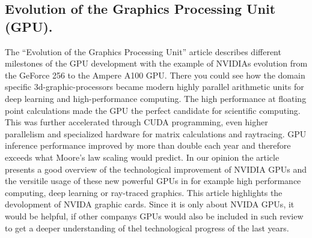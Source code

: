 \subsection{Evolution of the Graphics Processing Unit (GPU).}
The ``Evolution of the Graphics Processing Unit'' article describes different milestones of the GPU development with the example of NVIDIAs evolution from the GeForce 256 to the Ampere A100 GPU. There you could see how the domain specific 3d-graphic-processors became modern highly parallel arithmetic units for deep learning and high-performance computing.
\newline
The high performance at floating point calculations made the GPU the perfect candidate for scientific computing. This was further accelerated through CUDA programming, even higher parallelism and specialized hardware for matrix calculations and raytracing. GPU inference performance improved by more than double each year and therefore exceeds what Moore’s law scaling would predict.
\newline
In our opinion the article presents a good overview of the technological improvement of NVIDIA GPUs and the versitile usage of these new powerful GPUs in for example high performance computing, deep learning or ray-traced graphics. 
This article highlights the devolopment of NVIDA graphic cards. Since it is only about NVIDA GPUs, it would be helpful, if other companys GPUs would also be included in such review to get a deeper understanding of thel technological progress of the last years.